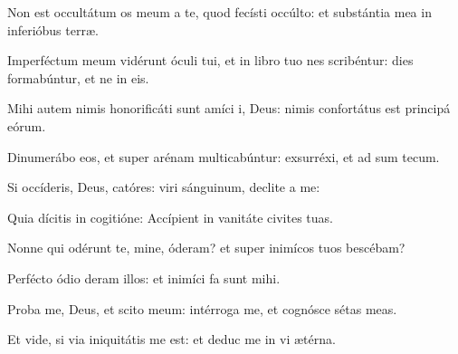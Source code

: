 \item {}

\item Non est occultátum os meum a te, quod fecísti  occúlto:\psstar{} et substántia mea in inferióbus terræ.

\item Imperféctum meum vidérunt óculi tui,\pscross{} et in libro tuo nes scribéntur:\psstar{} dies formabúntur, et ne in eis.

\item Mihi autem nimis honorificáti sunt amíci i, Deus:\psstar{} nimis confortátus est principá eórum.

\item Dinumerábo eos, et super arénam multicabúntur:\psstar{} exsurréxi, et ad sum tecum.

\item Si occíderis, Deus, catóres:\psstar{} viri sánguinum, declite a me:

\item Quia dícitis in cogitióne:\psstar{} Accípient in vanitáte civites tuas.

\item Nonne qui odérunt te, mine, óderam?\psstar{} et super inimícos tuos bescébam?

\item Perfécto ódio deram illos:\psstar{} et inimíci fa sunt mihi.

\item Proba me, Deus, et scito  meum:\psstar{} intérroga me, et cognósce sétas meas.

\item Et vide, si via iniquitátis  me est:\psstar{} et deduc me in vi ætérna.
